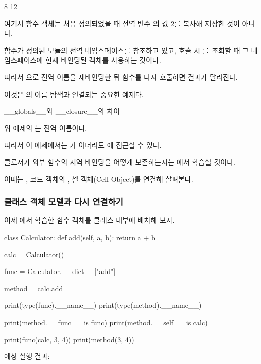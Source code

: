 \begin{dhkzsh}
8
12
\end{dhkzsh}

여기서  함수 객체는 처음 정의되었을 때 전역 변수 의 값 2를 복사해 저장한 것이 아니다.

함수가 정의된 모듈의 전역 네임스페이스를 참조하고 있고, 호출 시 를 조회할 때 그 네임스페이스에 현재 바인딩된 객체를 사용하는 것이다.

따라서 으로 전역 이름을 재바인딩한 뒤 함수를 다시 호출하면 결과가 달라진다.

이것은 의 이름 탐색과 연결되는 중요한 예제다.

\begin{dhknote}
\begin{dhksmry}[centered]
__globals__와 __closure__의 차이
\end{dhksmry}
\end{dhknote}

위 예제의 는 전역 이름이다.

따라서 이 예제에서는 가 이더라도 에 접근할 수 있다.

클로저가 외부 함수의 지역 바인딩을 어떻게 보존하는지는 에서 학습할 것이다.

이때는 , 코드 객체의 , 셀 객체(Cell Object)를 연결해 살펴본다.

\subsubsection{클래스 객체 모델과 다시 연결하기}

이제 에서 학습한 함수 객체를 클래스 내부에 배치해 보자.

\begin{dhkcode}
class Calculator:
    def add(self, a, b):
        return a + b

calc = Calculator()

func = Calculator.__dict__["add"]

method = calc.add

print(type(func).__name__)
print(type(method).__name__)

print(method.__func__ is func)
print(method.__self__ is calc)

print(func(calc, 3, 4))
print(method(3, 4))
\end{dhkcode}

예상 실행 결과:


